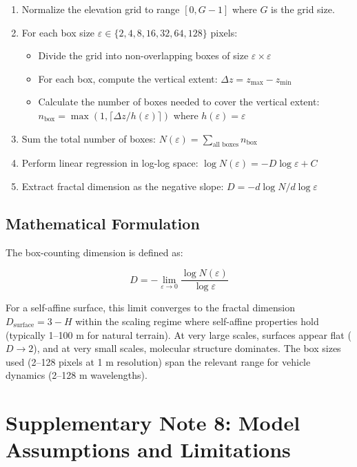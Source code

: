 \documentclass[11pt,letterpaper]{article}
\begin{document}
\begin{enumerate}
\item Normalize the elevation grid to range $[0, G-1]$ where $G$ is the grid size.

\item For each box size $\varepsilon \in \{2, 4, 8, 16, 32, 64, 128\}$ pixels:
\begin{itemize}
\item Divide the grid into non-overlapping boxes of size $\varepsilon \times \varepsilon$
\item For each box, compute the vertical extent: $\Delta z = z_{\max} - z_{\min}$
\item Calculate the number of boxes needed to cover the vertical extent: $n_{\text{box}} = \max(1, \lceil \Delta z / h(\varepsilon) \rceil)$ where $h(\varepsilon) = \varepsilon$
\end{itemize}

\item Sum the total number of boxes: $N(\varepsilon) = \sum_{\text{all boxes}} n_{\text{box}}$

\item Perform linear regression in log-log space: $\log N(\varepsilon) = -D \log \varepsilon + C$

\item Extract fractal dimension as the negative slope: $D = -d\log N / d\log \varepsilon$
\end{enumerate}

\subsection{Mathematical Formulation}

The box-counting dimension is defined as:

\begin{equation}
D = -\lim_{\varepsilon \to 0} \frac{\log N(\varepsilon)}{\log \varepsilon}
\end{equation}

For a self-affine surface, this limit converges to the fractal dimension $D_{\text{surface}} = 3 - H$ within the scaling regime where self-affine properties hold (typically 1–100 m for natural terrain). At very large scales, surfaces appear flat ($D \to 2$), and at very small scales, molecular structure dominates. The box sizes used (2–128 pixels at 1 m resolution) span the relevant range for vehicle dynamics (2–128 m wavelengths).

\section{Supplementary Note 8: Model Assumptions and Limitations}
\end{document}

